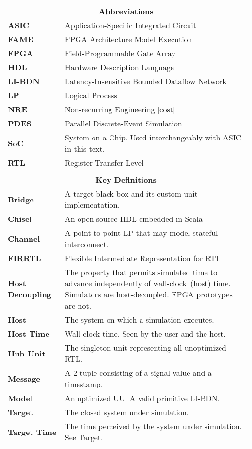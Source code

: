\begin{tabularx}{\textwidth}{lX}
\multicolumn{2}{c}{\textbf{Abbreviations}} \\
\textbf{ASIC} & Application-Specific Integrated Circuit \\
\textbf{FAME} & FPGA Architecture Model Execution \\
\textbf{FPGA} & Field-Programmable Gate Array \\
\textbf{HDL} & Hardware Description Language \\
\textbf{LI-BDN} & Latency-Insensitive Bounded Dataflow Network \\
\textbf{LP} & Logical Process \\
\textbf{NRE} & Non-recurring Engineering [cost] \\
\textbf{PDES} & Parallel Discrete-Event Simulation \\
\textbf{SoC} & System-on-a-Chip. Used interchangeably with ASIC in this text. \\
\textbf{RTL} & Register Transfer Level \\
& \\
\multicolumn{2}{c}{\textbf{Key Definitions}} \\
\textbf{Bridge} & A target black-box and its custom unit implementation. \\
\textbf{Chisel} & An open-source HDL embedded in Scala \\
\textbf{Channel} & A point-to-point LP that may model stateful interconnect. \\
\textbf{FIRRTL} & Flexible Intermediate Representation for RTL \\
\textbf{Host Decoupling} & The property that permits simulated time to advance independently of wall-clock~(host) time.
Simulators are host-decoupled. FPGA prototypes are not. \\
\textbf{Host} & The system on which a simulation executes. \\
\textbf{Host Time} & Wall-clock time. Seen by the user and the host. \\
\textbf{Hub Unit} & The singleton unit representing all unoptimized RTL. \\
\textbf{Message} & A 2-tuple consisting of a signal value and a timestamp. \\
\textbf{Model} & An optimized UU. A valid primitive LI-BDN. \\
\textbf{Target} & The closed system under simulation. \\
\textbf{Target Time} & The time perceived by the system under simulation. See Target. \\

\end{tabularx}
